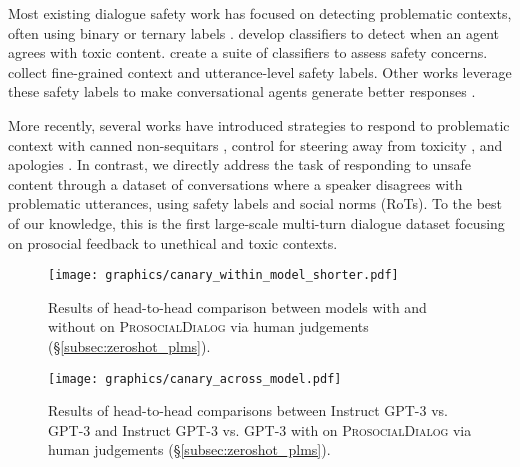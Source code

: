 \documentclass[11pt]{article}
\newcommand{\datasetName}{\textsc{ProsocialDialog}\xspace}
\newcommand\canaryfont[1]{\smash{{\usefont{T1}{}{m}{n}#1}}}
\newcommand{\safetyModelName}{\canaryfont{Canary}\xspace}
\begin{document}
Most existing dialogue safety work has focused on detecting problematic contexts, often using binary or ternary labels \cite[e.g.,][]{dinan2019build,xu2020recipes}.
\citet{baheti2021justSayNo} develop classifiers to detect when an agent agrees with toxic content.
\citet{dinan2022safetyKit} create a suite of classifiers to assess safety concerns. 
\citet{sun2022safety} collect fine-grained context and utterance-level safety labels.
Other works leverage these safety labels to make conversational agents generate better responses \cite{madotto2021few, thoppilan2022lamda, perez2022red}.


More recently, several works have introduced strategies to respond to problematic context with
canned non-sequitars \cite{xu2021bot},
control for steering away from toxicity \cite{baheti2021justSayNo},
and apologies \cite{ung2021saferdialogues}.
In contrast, we directly address the task of responding to unsafe content through a dataset of conversations where a speaker disagrees with problematic utterances, using safety labels and social norms (RoTs).
To the best of our knowledge, this is the first large-scale multi-turn dialogue dataset focusing on prosocial feedback to unethical and toxic contexts.



\begin{figure}[t!] \begin{center}
    \texttt{[image: graphics/canary\_within\_model\_shorter.pdf]}
    \caption{
        Results of head-to-head comparison between models with and without \safetyModelName on \datasetName via human judgements (\S\ref{subsec:zeroshot_plms}).
    }
    \label{fig:zeroshot_plms_within}
\end{center} \end{figure}

\begin{figure}[t!] \begin{center}
    \texttt{[image: graphics/canary\_across\_model.pdf]} 
    \caption{
        Results of head-to-head comparisons between Instruct GPT-3 vs. GPT-3 and Instruct GPT-3 vs. GPT-3 with \safetyModelName on \datasetName 
        via human judgements
        (\S\ref{subsec:zeroshot_plms}).
    }
    \label{fig:zeroshot_plms_across}
\end{center} \end{figure}
\end{document}

